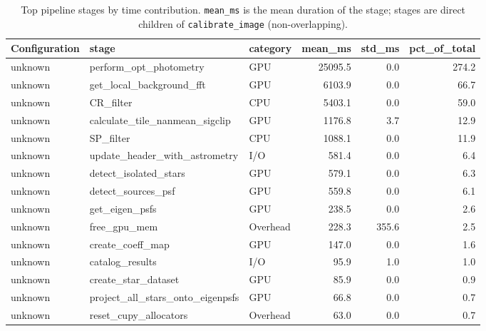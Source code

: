 \begin{table}
\caption{Top pipeline stages by time contribution. \texttt{mean\_ms} is the mean duration of the stage; stages are direct children of \texttt{calibrate\_image} (non-overlapping).}
\label{tab:profiling_stages}
\begin{tabular}{lllrrr}
\toprule
Configuration & stage & category & mean_ms & std_ms & pct_of_total \\
\midrule
unknown & perform_opt_photometry & GPU & 25095.5 & 0.0 & 274.2 \\
unknown & get_local_background_fft & GPU & 6103.9 & 0.0 & 66.7 \\
unknown & CR_filter & CPU & 5403.1 & 0.0 & 59.0 \\
unknown & calculate_tile_nanmean_sigclip & GPU & 1176.8 & 3.7 & 12.9 \\
unknown & SP_filter & CPU & 1088.1 & 0.0 & 11.9 \\
unknown & update_header_with_astrometry & I/O & 581.4 & 0.0 & 6.4 \\
unknown & detect_isolated_stars & GPU & 579.1 & 0.0 & 6.3 \\
unknown & detect_sources_psf & GPU & 559.8 & 0.0 & 6.1 \\
unknown & get_eigen_psfs & GPU & 238.5 & 0.0 & 2.6 \\
unknown & free_gpu_mem & Overhead & 228.3 & 355.6 & 2.5 \\
unknown & create_coeff_map & GPU & 147.0 & 0.0 & 1.6 \\
unknown & catalog_results & I/O & 95.9 & 1.0 & 1.0 \\
unknown & create_star_dataset & GPU & 85.9 & 0.0 & 0.9 \\
unknown & project_all_stars_onto_eigenpsfs & GPU & 66.8 & 0.0 & 0.7 \\
unknown & reset_cupy_allocators & Overhead & 63.0 & 0.0 & 0.7 \\
\bottomrule
\end{tabular}
\end{table}
